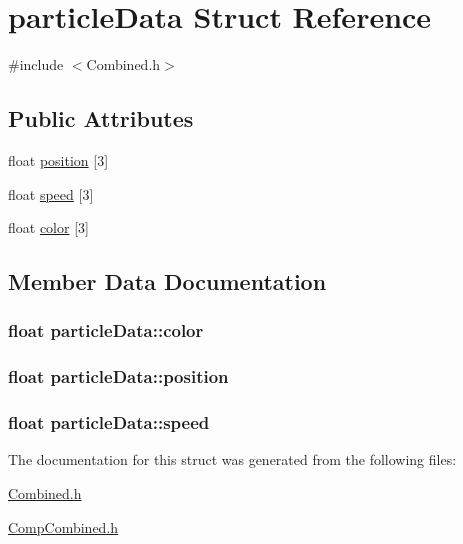 \hypertarget{structparticleData}{\section{particle\-Data Struct Reference}
\label{structparticleData}
}


{\ttfamily \#include $<$Combined.\-h$>$}

\subsection*{Public Attributes}
\begin{DoxyCompactItemize}
\item 
float \hyperlink{structparticleData_a69ecbea3e559cccbcf104f898b20efc4}{position} \mbox{[}3\mbox{]}
\item 
float \hyperlink{structparticleData_ac6266b83fbf38c6dd7af2489b05190cb}{speed} \mbox{[}3\mbox{]}
\item 
float \hyperlink{structparticleData_ad9150b7c23a39667acef205b798d412b}{color} \mbox{[}3\mbox{]}
\end{DoxyCompactItemize}


\subsection{Member Data Documentation}
\hypertarget{structparticleData_ad9150b7c23a39667acef205b798d412b}{
\subsubsection[{color}]{\setlength{\rightskip}{0pt plus 5cm}float particle\-Data\-::color}}\label{structparticleData_ad9150b7c23a39667acef205b798d412b}
\hypertarget{structparticleData_a69ecbea3e559cccbcf104f898b20efc4}{
\subsubsection[{position}]{\setlength{\rightskip}{0pt plus 5cm}float particle\-Data\-::position}}\label{structparticleData_a69ecbea3e559cccbcf104f898b20efc4}
\hypertarget{structparticleData_ac6266b83fbf38c6dd7af2489b05190cb}{
\subsubsection[{speed}]{\setlength{\rightskip}{0pt plus 5cm}float particle\-Data\-::speed}}\label{structparticleData_ac6266b83fbf38c6dd7af2489b05190cb}


The documentation for this struct was generated from the following files\-:\begin{DoxyCompactItemize}
\item 
\hyperlink{Combined_8h}{Combined.\-h}\item 
\hyperlink{CompCombined_8h}{Comp\-Combined.\-h}\end{DoxyCompactItemize}
